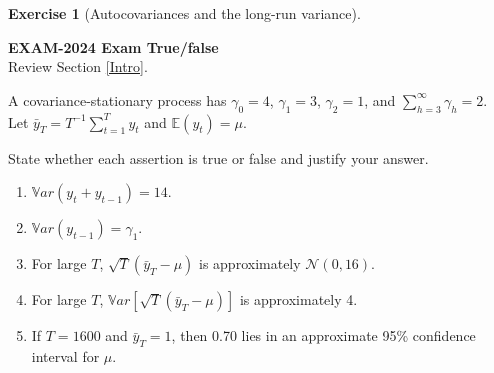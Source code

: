 \documentclass[
  11pt,
]{book}
\providecommand{\tightlist}{%
  \setlength{\itemsep}{0pt}\setlength{\parskip}{0pt}}
\theoremstyle{definition}
\theoremstyle{definition}
\theoremstyle{definition}
\newtheorem{exercise}{Exercise}[chapter]
\theoremstyle{definition}
\theoremstyle{remark}
\begin{document}
\begin{exercisebox}

\begin{exercise}[Autocovariances and the long-run variance]
\protect\hypertarget{exr:ex-exam2024-long-run-variance}{}\label{exr:ex-exam2024-long-run-variance}

\textbf{EXAM-2024 \textbar{} Exam \textbar{} True/false}\\
Review Section \ref{Intro}.

A covariance-stationary process has \(\gamma_0=4\), \(\gamma_1=3\), \(\gamma_2=1\), and \(\sum_{h=3}^{\infty}\gamma_h=2\). Let \(\bar y_T=T^{-1}\sum_{t=1}^T y_t\) and \(\mathbb E(y_t)=\mu\).

State whether each assertion is true or false and justify your answer.

\begin{enumerate}
\def\labelenumi{\arabic{enumi}.}
\tightlist
\item
  \(\mathbb{V}ar(y_t+y_{t-1})=14\).
\item
  \(\mathbb{V}ar(y_{t-1})=\gamma_1\).
\item
  For large \(T\), \(\sqrt T(\bar y_T-\mu)\) is approximately \(\mathcal N(0,16)\).
\item
  For large \(T\), \(\mathbb{V}ar[\sqrt T(\bar y_T-\mu)]\) is approximately 4.
\item
  If \(T=1600\) and \(\bar y_T=1\), then 0.70 lies in an approximate 95\% confidence interval for \(\mu\).
\end{enumerate}

\end{exercise}

\end{exercisebox}

\end{document}
